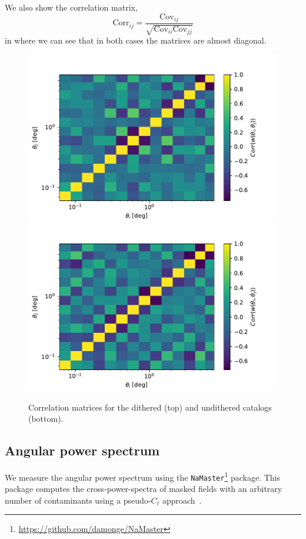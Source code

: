 \documentclass[\docopts]{\docclass}
\begin{document}
We also show the correlation matrix,
\begin{equation}
\mathrm{Corr}_{ij}=\frac{\mathrm{Cov}_{ij}}{\sqrt{\mathrm{Cov}_{ii}\mathrm{Cov}_{jj}}}
\end{equation}
in  where we can see that in both cases the matrices are almost diagonal.
\begin{figure}
\centering
\includegraphics[width=0.9\columnwidth]{correlation_matrix_dithered_25p3.pdf}
\includegraphics[width=0.9\columnwidth]{correlation_matrix_undithered_25p3.pdf}
\caption{Correlation matrices for the dithered (top) and undithered catalogs (bottom).}
\label{fig:2pt_cov}
\end{figure}
\subsection{Angular power spectrum}
We measure the angular power spectrum using the \texttt{NaMaster}\footnote{\url{https://github.com/damonge/NaMaster}} package. This package computes the cross-power-spectra of masked fields with an arbitrary number of contaminants using a pseudo-$C_{\ell}$ approach~\citep{2002ApJ...567....2H,2017MNRAS.465.1847E}.
\end{document}

